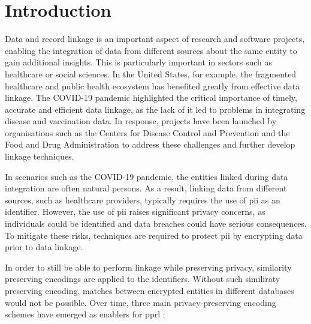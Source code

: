 
\chapter{Introduction}  \label{sec:introduction}
Data and record linkage is an important aspect of research and software projects, enabling the integration of data from different sources about the same entity to gain additional insights.
This is particularly important in sectors such as healthcare or social sciences.
In the United States, for example, the fragmented healthcare and public health ecosystem has benefited greatly from effective data linkage.
The COVID-19 pandemic highlighted the critical importance of timely, accurate and efficient data linkage, as the lack of it led to problems in integrating disease and vaccination data.
In response, projects have been launched by organisations such as the Centers for Disease Control and Prevention and the Food and Drug Administration to address these challenges and further develop linkage techniques. \cite{vidanage2024}

In scenarios such as the COVID-19 pandemic, the entities linked during data integration are often natural persons.
As a result, linking data from different sources, such as healthcare providers, typically requires the use of \ac{pii} as an identifier.
However, the use of \ac{pii} raises significant privacy concerns, as individuals could be identified and data breaches could have serious consequences.
To mitigate these risks, techniques are required to protect \ac{pii} by encrypting data prior to data linkage. \cite{vidanage2024}

In order to still be able to perform linkage while preserving privacy, similarity preserving encodings are applied to the identifiers.
Without such similiraty preserving encoding, matches between encrypted entities in different databases would not be possible.
Over time, three main privacy-preserving encoding schemes have emerged as enablers for \ac{pprl} \cite{vidanage2024, schaefer2024}: 

